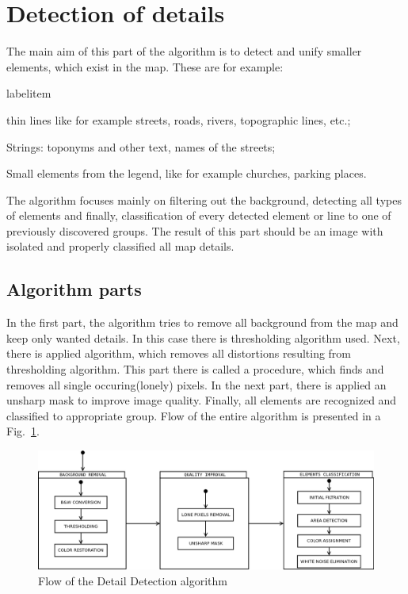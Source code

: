 \documentclass[a4paper,onecolumn,oneside,12pt]{memoir}
\makeatletter
\renewenvironment{itemize}{
  \begin{list}{  
  \csname labelitem\romannumeral\the\@listdepth\endcsname}{
  \setlength{\leftmargin}{1em}
	\setlength{\topsep}{6pt}%
	\setlength{\partopsep}{0pt}%
	\setlength{\parskip}{0pt}%
	\setlength{\parsep}{0pt}%
	\setlength{\itemsep}{0pt}}
}{
  \end{list}
}
\makeatother
\begin{document}
\section{Detection of details}

The main aim of this part of the algorithm is to detect and unify smaller elements, which exist in
the map. These are for example:
\begin{itemize}
  \item thin lines like for example streets, roads, rivers, topographic lines, etc.;
  \item Strings: toponyms and other text, names of the streets;
  \item Small elements from the legend, like for example churches, parking places.
\end{itemize}

The algorithm focuses mainly on filtering out the background, detecting all types of elements and
finally, classification of every detected element or line to one of previously discovered groups.
The result of this part should be an image with isolated and properly classified all map details.

\subsection{Algorithm parts}

In the first part, the algorithm tries to remove all background from the map and keep only wanted
details. In this case there is thresholding algorithm used. Next, there is applied algorithm, which
removes all distortions resulting from thresholding algorithm. This part there is called a 
procedure, which finds and removes all single occuring(lonely) pixels. In the next part, there is
applied an unsharp mask to improve image quality. Finally, all elements are recognized and 
classified to appropriate group. Flow of the entire algorithm is presented in a 
Fig.~\ref{detailDetectionFlow}.

\begin{figure}[!ht]
\begin{center}
\includegraphics[scale=0.4]{images/detailDetectionFlow.png}
\caption{Flow of the Detail Detection algorithm}
\label{detailDetectionFlow}
\end{center}
\end{figure}
\end{document}
